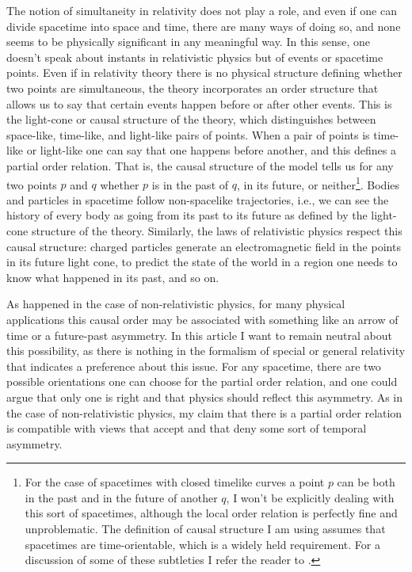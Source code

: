 \documentclass[12 pt]{article}
\begin{document}
The notion of simultaneity in relativity does not play a role, and even if one can divide spacetime into space and time, there are many ways of doing so, and none seems to be physically significant in any meaningful way. In this sense, one doesn't speak about instants in relativistic physics but of events or spacetime points. Even if in relativity theory there is no physical structure defining whether two points are simultaneous, the theory incorporates an order structure that allows us to say that certain events happen before or after other events. This is the light-cone or causal structure of the theory, which distinguishes between space-like, time-like, and light-like pairs of points. When a pair of points is time-like or light-like one can say that one happens before another, and this defines a partial order relation. That is, the causal structure of the model tells us for any two points $p$ and $q$ whether $p$ is in the past of $q$, in its future, or neither\footnote{For the case of spacetimes with closed timelike curves a point $p$ can be both in the past and in the future of another $q$, I won't be explicitly dealing with this sort of spacetimes, although the local order relation is perfectly fine and unproblematic. The definition of causal structure I am using assumes that spacetimes are time-orientable, which is a widely held requirement. For a discussion of some of these subtleties I refer the reader to \citep{Manchak2011}.}. Bodies and particles in spacetime follow non-spacelike trajectories, i.e., we can see the history of every body as going from its past to its future as defined by the light-cone structure of the theory. Similarly, the laws of relativistic physics respect this causal structure: charged particles generate an electromagnetic field in the points in its future light cone, to predict the state of the world in a region one needs to know what happened in its past, and so on. 

As happened in the case of non-relativistic physics, for many physical applications this causal order may be associated with something like an arrow of time or a future-past asymmetry. In this article I want to remain neutral about this possibility, as there is nothing in the formalism of special or general relativity that indicates a preference about this issue. For any spacetime, there are two possible orientations one can choose for the partial order relation, and one could argue that only one is right and that physics should reflect this asymmetry. As in the case of non-relativistic physics, my claim that there is a partial order relation is compatible with views that accept and that deny some sort of temporal asymmetry.
\end{document}
